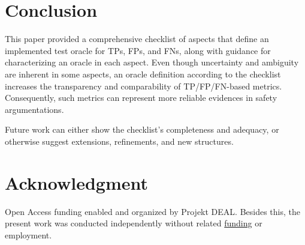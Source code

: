\documentclass[conference]{IEEEtran}
\begin{document}

\section{Conclusion}
\label{sec:conclusion}

This paper provided a comprehensive checklist of aspects that define an implemented test oracle for TPs, FPs, and FNs, along with guidance for characterizing an oracle in each aspect.
Even though uncertainty and ambiguity are inherent in some aspects, an oracle definition according to the checklist increases the transparency and comparability of TP/FP/FN-based metrics.
Consequently, such metrics can represent more reliable evidences in safety argumentations.

Future work can either show the checklist's completeness and adequacy, or otherwise suggest extensions, refinements, and new structures. 



\section*{Acknowledgment}
\label{sec:acknowledgment}

Open Access funding enabled and organized by Projekt DEAL. %
Besides this, the present work was conducted independently without related \href{https://ko-fi.com/michaelhoss}{funding} or employment. 

%
% 
% 
% 
% 
% 


{\small


}
\end{document}
